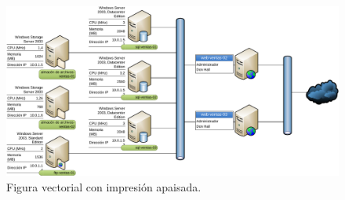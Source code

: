 \documentclass[11pt,a4paper]{article}
\begin{document}
\begin{figure}
	\centering
	\includegraphics[width=0.98\textheight]{network} 
	\caption[Gráfico de apaisado Visio]{Figura vectorial con impresión apaisada.}
	\label{fig:sideways}
\end{figure}
\end{document}
